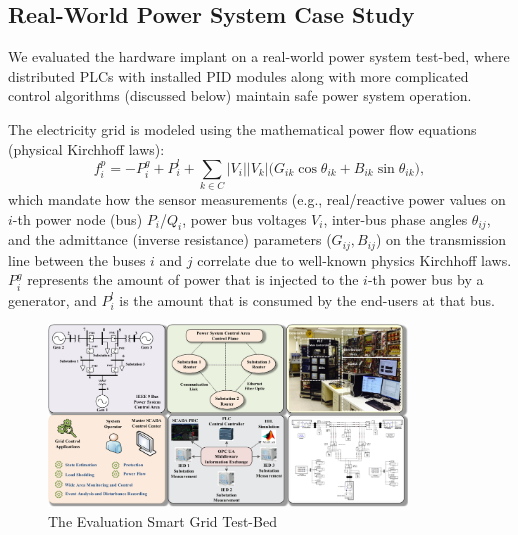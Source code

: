 \subsection{Real-World Power System Case Study}

We evaluated the hardware implant on a real-world power system test-bed, where distributed PLCs with installed PID modules along with more complicated control algorithms (discussed below) maintain safe power system operation. 

The electricity grid is modeled using the mathematical power flow equations (physical Kirchhoff laws): 
\begin{equation}
\label{eq:powerflowreal}
f_i^p = -P_i^g+P_i^l + \sum_{k \in C}{|V_i||V_k| (G_{ik} \cos{\theta_{ik}} + B_{ik} \sin{\theta_{ik}}}),
\end{equation}
which mandate how the sensor measurements (e.g., real/reactive power values on $i$-th power node (bus) $P_i$/$Q_i$, power bus voltages $V_i$, inter-bus phase angles $\theta_{ij}$, and the admittance (inverse resistance) parameters ($G_{ij}, B_{ij}$) on the transmission line between the buses $i$ and $j$ correlate due to well-known physics Kirchhoff laws. $P_i^g$ represents the amount of power that is injected to the $i$-th power bus by a generator, and $P_i^l$ is the amount that is consumed by the end-users at that bus. 



\begin{figure}[ht]
  \centering
  \includegraphics[width=0.85\textwidth]{figures/testbed2}
  \vspace{-0.0in}
  \caption{The Evaluation Smart Grid Test-Bed}
  \vspace{-0.1in}
  \label{fig:testbed}
\end{figure}





